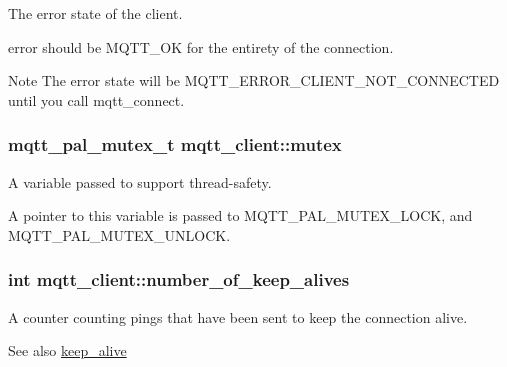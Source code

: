 The error state of the client. 

error should be M\+Q\+T\+T\+\_\+\+OK for the entirety of the connection.

\begin{DoxyNote}{Note}
The error state will be M\+Q\+T\+T\+\_\+\+E\+R\+R\+O\+R\+\_\+\+C\+L\+I\+E\+N\+T\+\_\+\+N\+O\+T\+\_\+\+C\+O\+N\+N\+E\+C\+T\+ED until you call mqtt\+\_\+connect. 
\end{DoxyNote}
\subsubsection[{\texorpdfstring{mutex}{mutex}}]{\setlength{\rightskip}{0pt plus 5cm}mqtt\+\_\+pal\+\_\+mutex\+\_\+t mqtt\+\_\+client\+::mutex}\hypertarget{structmqtt__client_a885516373913fa6b50e960d50d4a5cba}{}\label{structmqtt__client_a885516373913fa6b50e960d50d4a5cba}


A variable passed to support thread-\/safety. 

A pointer to this variable is passed to {\ttfamily M\+Q\+T\+T\+\_\+\+P\+A\+L\+\_\+\+M\+U\+T\+E\+X\+\_\+\+L\+O\+CK}, and {\ttfamily M\+Q\+T\+T\+\_\+\+P\+A\+L\+\_\+\+M\+U\+T\+E\+X\+\_\+\+U\+N\+L\+O\+CK}. 
\subsubsection[{\texorpdfstring{number\+\_\+of\+\_\+keep\+\_\+alives}{number_of_keep_alives}}]{\setlength{\rightskip}{0pt plus 5cm}int mqtt\+\_\+client\+::number\+\_\+of\+\_\+keep\+\_\+alives}\hypertarget{structmqtt__client_ac23a02868e9b8c5cd2619b73ee4fcea6}{}\label{structmqtt__client_ac23a02868e9b8c5cd2619b73ee4fcea6}


A counter counting pings that have been sent to keep the connection alive. 

\begin{DoxySeeAlso}{See also}
\hyperlink{structmqtt__client_aff533344a060e58277698039f547147a}{keep\+\_\+alive} 
\end{DoxySeeAlso}
